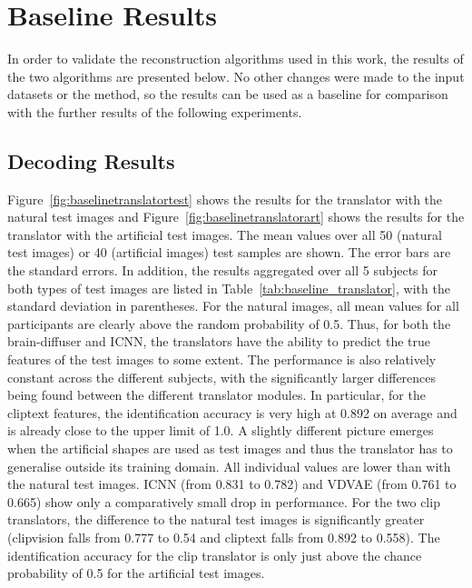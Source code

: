 \section{Baseline Results}
In order to validate the reconstruction algorithms used in this work, the results of the two algorithms are presented below. No other changes were made to the input datasets or the method, so the results can be used as a baseline for comparison with the further results of the following experiments.

\subsection{Decoding Results}

Figure~\ref{fig:baselinetranslatortest} shows the results for the translator with the natural test images and Figure~\ref{fig:baselinetranslatorart} shows the results for the translator with the artificial test images. The mean values over all 50 (natural test images) or 40 (artificial images) test samples are shown. The error bars are the standard errors. In addition, the results aggregated over all 5 subjects for both types of test images are listed in Table~\ref{tab:baseline_translator}, with the standard deviation in parentheses.
For the natural images, all mean values for all participants are clearly above the random probability of 0.5. Thus, for both the brain-diffuser and ICNN, the translators have the ability to predict the true features of the test images to some extent. The performance is also relatively constant across the different subjects, with the significantly larger differences being found between the different translator modules. In particular, for the cliptext features, the identification accuracy is very high at 0.892 on average and is already close to the upper limit of 1.0. A slightly different picture emerges when the artificial shapes are used as test images and thus the translator has to generalise outside its training domain. All individual values are lower than with the natural test images. ICNN (from 0.831 to 0.782) and VDVAE (from 0.761 to 0.665) show only a comparatively small drop in performance. For the two clip translators, the difference to the natural test images is significantly greater (clipvision falls from 0.777 to 0.54 and cliptext falls from 0.892 to 0.558). The identification accuracy for the clip translator is only just above the chance probability of 0.5 for the artificial test images.

